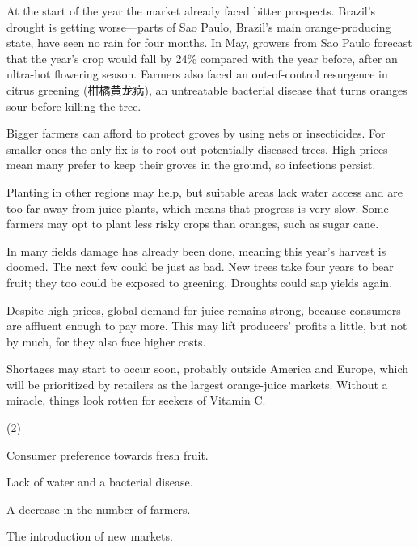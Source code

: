 \documentclass{英语试卷}
\begin{document}
\par At the start of the year the market already faced bitter prospects. Brazil's drought is getting worse—parts of Sao Paulo, Brazil's main orange-producing state, have seen no rain for four months. In May, growers from Sao Paulo forecast that the year's crop would fall by 24\% compared with the year before, after an ultra-hot flowering season. Farmers also faced an out-of-control resurgence in citrus greening (柑橘黄龙病), an untreatable bacterial disease that turns oranges sour before killing the tree.\par
\par Bigger farmers can afford to protect groves by using nets or insecticides. For smaller ones the only fix is to root out potentially diseased trees. High prices mean many prefer to keep their groves in the ground, so infections persist.\par
\par Planting in other regions may help, but suitable areas lack water access and are too far away from juice plants, which means that progress is very slow. Some farmers may opt to plant less risky crops than oranges, such as sugar cane.\par
\par In many fields damage has already been done, meaning this year's harvest is doomed. The next few could be just as bad. New trees take four years to bear fruit; they too could be exposed to greening. Droughts could sap yields again.\par
\par Despite high prices, global demand for juice remains strong, because consumers are affluent enough to pay more. This may lift producers' profits a little, but not by much, for they also face higher costs.\par
\par Shortages may start to occur soon, probably outside America and Europe, which will be prioritized by retailers as the largest orange-juice markets. Without a miracle, things look rotten for seekers of Vitamin C.\par
{}
\begin{choices}(2)
  \item Consumer preference towards fresh fruit.
  \item Lack of water and a bacterial disease.
  \item A decrease in the number of farmers.
  \item The introduction of new markets.
\end{choices}
\end{document}
